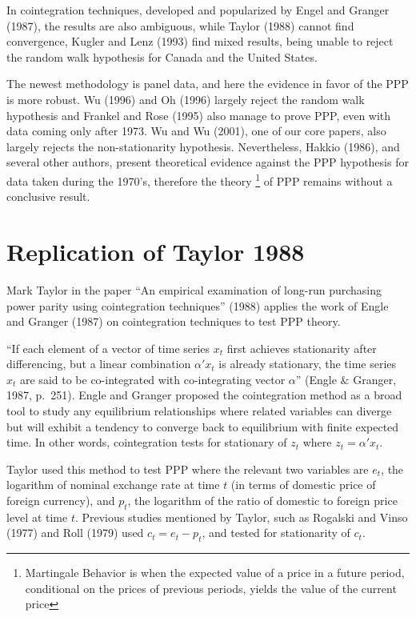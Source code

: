 \documentclass[]{article}
\begin{document}
In cointegration techniques, developed and popularized by Engel and Granger (1987), the results are also ambiguous, while Taylor (1988) cannot find convergence, Kugler and Lenz (1993) find mixed results, being unable to reject the random walk hypothesis for
Canada and the United States.

The newest methodology is panel data, and here the evidence in favor of the PPP is more robust. Wu (1996) and Oh (1996) largely reject the random walk hypothesis and Frankel and Rose (1995) also manage to prove PPP, even with data coming only after 1973. Wu and Wu (2001), one of our core papers, also largely rejects the non-stationarity hypothesis. Nevertheless, Hakkio (1986), and several other authors, present theoretical
evidence against the PPP hypothesis for data taken during the 1970's, therefore the theory \footnote{Martingale Behavior is when the expected value of a price in a future period, conditional on the prices of previous periods, yields the value of the current price} of PPP remains without a conclusive result.

\hypertarget{replication-of-taylor-1988}{%
\section{Replication of Taylor 1988}\label{replication-of-taylor-1988}}

Mark Taylor in the paper ``An empirical examination of long-run purchasing power parity using cointegration techniques'' (1988) applies the work of Engle and Granger (1987) on cointegration techniques to test PPP theory.

``If each element of a vector of time series \(x_t\) first achieves stationarity after differencing, but a linear combination \(\alpha ' x_t\) is already stationary, the time series \(x_t\) are said to be co-integrated with co-integrating vector \(\alpha\)'' (Engle \(\&\) Granger, 1987, p.~251). Engle and Granger proposed the cointegration method as a broad tool to study any equilibrium relationships where related variables can diverge but will exhibit a tendency to converge back to equilibrium with finite expected time. In other words, cointegration tests for stationary of \(z_t\) where \(z_t = \alpha ' x_t\).

Taylor used this method to test PPP where the relevant two variables are \(e_t\), the logarithm of nominal exchange rate at time \(t\) (in terms of domestic price of foreign currency), and \(p_t\), the logarithm of the ratio of domestic to foreign price level at time \(t\). Previous studies mentioned by Taylor, such as Rogalski and Vinso (1977) and Roll (1979) used \(c_t = e_t - p_t\), and tested for stationarity of \(c_t\).
\end{document}
